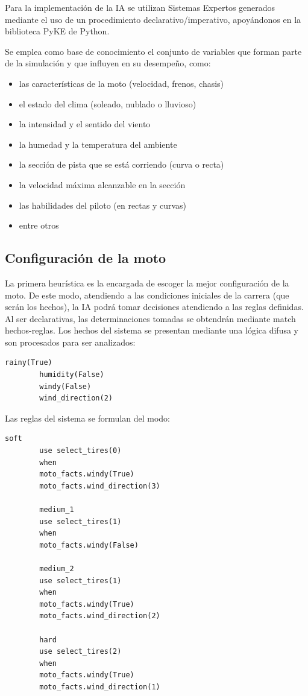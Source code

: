 \documentclass[12pt, letterpaper,spanish]{article}
\theoremstyle{definition}
\theoremstyle{remark}
\begin{document}
	Para la implementación de la IA se utilizan Sistemas Expertos generados mediante el uso de un procedimiento declarativo/imperativo, apoyándonos en la biblioteca PyKE\cite{pyke} de Python.
	
	Se emplea como base de conocimiento el conjunto de variables que forman parte de la simulación y que influyen en su desempeño, como:
	\begin{itemize}
		\item las características de la moto (velocidad, frenos, chasis)
		\item el estado del clima (soleado, nublado o lluvioso)
		\item la intensidad y el sentido del viento
		\item la humedad y la temperatura del ambiente
		\item la sección de pista que se está corriendo (curva o recta)
		\item la velocidad máxima alcanzable en la sección
		\item las habilidades del piloto (en rectas y curvas)
		\item entre otros
	\end{itemize}
	
	\subsection{Configuración de la moto}
	La primera heurística es la encargada de escoger la mejor configuración de la moto. De este modo, atendiendo a las condiciones iniciales de la carrera (que serán los hechos), la IA podrá tomar decisiones atendiendo a las reglas definidas. Al ser declarativas, las determinaciones tomadas se obtendrán mediante match hechos-reglas.
	Los hechos del sistema se presentan mediante una lógica difusa y son procesados para ser analizados:
	\begin{lstlisting}[language={PySharp}, label={Script}]
		rainy(True)
		humidity(False)
		windy(False)
		wind_direction(2)
	\end{lstlisting}
	
	Las reglas del sistema se formulan del modo:
	\begin{lstlisting}[language={PySharp}, label={Script}]
		soft
		use select_tires(0)
		when
		moto_facts.windy(True)
		moto_facts.wind_direction(3)
		
		medium_1
		use select_tires(1)
		when
		moto_facts.windy(False)
		
		medium_2
		use select_tires(1)
		when
		moto_facts.windy(True)
		moto_facts.wind_direction(2)
		
		hard
		use select_tires(2)
		when
		moto_facts.windy(True)
		moto_facts.wind_direction(1)
	\end{lstlisting}
	
\end{document}
